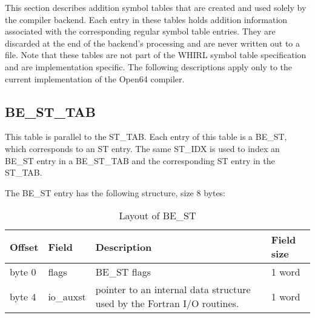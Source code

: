 This section describes addition symbol tables that are created and
used solely by the compiler backend. Each entry in these tables holds
addition information associated with the corresponding regular symbol
table entries. They are discarded at the end of the backend's
processing and are never written out to a file. Note that these tables
are not part of the WHIRL symbol table specification and are
implementation specific. The following descriptions apply only to the
current implementation of the Open64 compiler.

\subsection{BE\_ST\_TAB}
\label{be-st-tab}

This table is parallel to the ST\_TAB. Each entry of this table is a
BE\_ST, which corresponds to an
%
ST entry. The same
%
ST\_IDX is used to
index an
%
BE\_ST entry in a
%
BE\_ST\_TAB and the corresponding
%
ST entry
in the ST\_TAB.

The
%
BE\_ST entry has the following structure, size 8 bytes:

\begin{table}[h]
\centering
\caption{Layout of BE\_ST}
\label{Table_41} 
\begin{tabular}{|l|l|l|l|}\hline
Offset & Field & Description & Field size \\\hline\hline
byte 0 & flags &
\index{BE\_ST}%
BE\_ST flags & 1 word \\\hline
byte 4 & io\_auxst & pointer to an internal data structure used by the
Fortran I/O routines. & 1 word\\\hline
\end{tabular}
\end{table}

